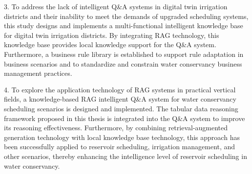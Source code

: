 \begin{eabstract}
        3. To address the lack of intelligent Q\&A systems in digital twin irrigation districts and their inability to meet the demands of upgraded scheduling systems, this study designs and implements a multi-functional intelligent knowledge base for digital twin irrigation districts. By integrating RAG technology, this knowledge base provides local knowledge support for the Q\&A system. Furthermore, a business rule library is established to support rule adaptation in business scenarios and to standardize and constrain water conservancy business management practices.

        4. To explore the application technology of RAG systems in practical vertical fields, a knowledge-based RAG intelligent Q\&A system for water conservancy scheduling scenarios is designed and implemented. The tabular data reasoning framework proposed in this thesis is integrated into the Q\&A system to improve its reasoning effectiveness. Furthermore, by combining retrieval-augmented generation technology with local knowledge base technology, this approach has been successfully applied to reservoir scheduling, irrigation management, and other scenarios, thereby enhancing the intelligence level of reservoir scheduling in water conservancy.
    \end{eabstract}
    
    